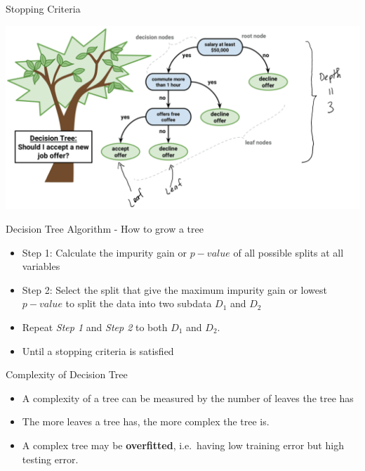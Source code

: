 \documentclass[
  ignorenonframetext,
]{beamer}
\providecommand{\tightlist}{%
  \setlength{\itemsep}{0pt}\setlength{\parskip}{0pt}}
\begin{document}
\begin{frame}{Stopping Criteria}
\protect\hypertarget{stopping-criteria-1}{}

\includegraphics{images2/tree6.png}

\end{frame}

\begin{frame}{Decision Tree Algorithm - How to grow a tree}
\protect\hypertarget{decision-tree-algorithm---how-to-grow-a-tree}{}

\begin{itemize}
\tightlist
\item
  Step 1: Calculate the impurity gain or \(p-value\) of all possible
  splits at all variables
\item
  Step 2: Select the split that give the maximum impurity gain or lowest
  \(p-value\) to split the data into two subdata \(D_1\) and \(D_2\)
\item
  Repeat \emph{Step 1} and \emph{Step 2} to both \(D_1\) and \(D_2\).
\item
  Until a stopping criteria is satisfied
\end{itemize}

\end{frame}

\begin{frame}{Complexity of Decision Tree}
\protect\hypertarget{complexity-of-decision-tree}{}

\begin{itemize}
\tightlist
\item
  A complexity of a tree can be measured by the number of leaves the
  tree has
\item
  The more leaves a tree has, the more complex the tree is.
\item
  A complex tree may be \textbf{overfitted}, i.e.~having low training
  error but high testing error.
\end{itemize}

\end{frame}
\end{document}
